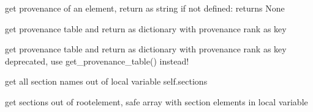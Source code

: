 \documentclass[letterpaper,10pt,english]{sphinxmanual}
\begin{document}
\begin{fulllineitems}

\begin{fulllineitems}
\label{pygeomod:pygeomod.geomodeller_xml_obj.GeomodellerClass.get_provenance}
get provenance of an element, return as string
if not defined: returns None

\end{fulllineitems}


\begin{fulllineitems}
\label{pygeomod:pygeomod.geomodeller_xml_obj.GeomodellerClass.get_provenance_table}
get provenance table and return as dictionary with provenance rank as key

\end{fulllineitems}


\begin{fulllineitems}
\label{pygeomod:pygeomod.geomodeller_xml_obj.GeomodellerClass.get_provenances}
get provenance table and return as dictionary with provenance rank as key
deprecated, use get\_provenance\_table() instead!

\end{fulllineitems}


\begin{fulllineitems}
\label{pygeomod:pygeomod.geomodeller_xml_obj.GeomodellerClass.get_section_names}
get all section names out of local variable self.sections

\end{fulllineitems}


\begin{fulllineitems}
\label{pygeomod:pygeomod.geomodeller_xml_obj.GeomodellerClass.get_sections}
get sections out of rootelement, safe array with section elements 
in local variable


\end{fulllineitems}
\end{fulllineitems}
\end{document}
